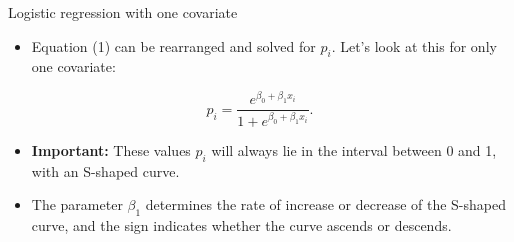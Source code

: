 \documentclass[10pt,ignorenonframetext,]{beamer}
\providecommand{\tightlist}{%
  \setlength{\itemsep}{0pt}\setlength{\parskip}{0pt}}
\begin{document}
\begin{frame}

\begin{block}{Logistic regression with one covariate}

\vspace{2mm}

\begin{itemize}
\tightlist
\item
  Equation (1) can be rearranged and solved for \(p_i\). Let's look at
  this for only one covariate:
\end{itemize}

\[ p_i= \frac{e^{\beta_0+\beta_1 x_i}}{1 + e^{\beta_0 + \beta_1 x_i}}.\]

\begin{itemize}
\item
  \textbf{Important:} These values \(p_i\) will always lie in the
  interval between 0 and 1, with an S-shaped curve.
\item
  The parameter \(\beta_1\) determines the rate of increase or decrease
  of the S-shaped curve, and the sign indicates whether the curve
  ascends or descends.
\end{itemize}

\end{block}

\end{frame}
\end{document}
